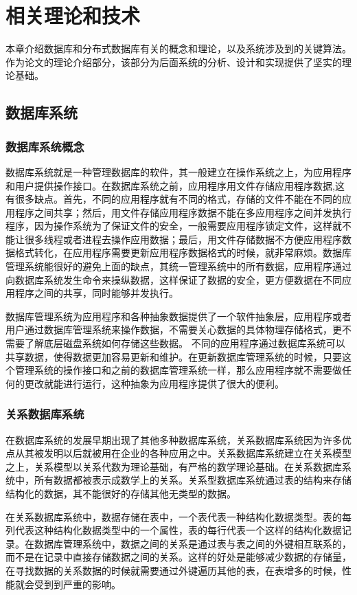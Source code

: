 
\chapter{相关理论和技术}
本章介绍数据库和分布式数据库有关的概念和理论，以及系统涉及到的关键算法。作为论文的理论介绍部分，该部分为后面系统的分析、设计和实现提供了坚实的理论基础。
\section{数据库系统}
\subsection{数据库系统概念}
数据库系统就是一种管理数据库的软件，其一般建立在操作系统之上，为应用程序和用户提供操作接口。在数据库系统之前，应用程序用文件存储应用程序数据,这有很多缺点。首先，不同的应用程序就有不同的格式，存储的文件不能在不同的应用程序之间共享；然后，用文件存储应用程序数据不能在多应用程序之间并发执行程序，因为操作系统为了保证文件的安全，一般需要应用程序锁定文件，这样就不能让很多线程或者进程去操作应用数据；最后，用文件存储数据不方便应用程序数据格式转化，在应用程序需要更新应用程序数据格式的时候，就非常麻烦。数据库管理系统能很好的避免上面的缺点，其统一管理系统中的所有数据，应用程序通过向数据库系统发生命令来操纵数据，这样保证了数据的安全，更方便数据在不同应用程序之间的共享，同时能够并发执行。

数据库管理系统为应用程序和各种抽象数据提供了一个软件抽象层，应用程序或者用户通过数据库管理系统来操作数据，不需要关心数据的具体物理存储格式，更不需要了解底层磁盘系统如何存储这些数据。
不同的应用程序通过数据库系统可以共享数据，使得数据更加容易更新和维护。在更新数据库管理系统的时候，只要这个管理系统的操作接口和之前的数据库管理系统一样，那么应用程序就不需要做任何的更改就能进行运行，这种抽象为应用程序提供了很大的便利。
\subsection{关系数据库系统}
在数据库系统的发展早期出现了其他多种数据库系统，关系数据库系统因为许多优点从其被发明以后就被用在企业的各种应用之中。关系数据库系统建立在关系模型之上，关系模型以关系代数为理论基础，有严格的数学理论基础。在关系数据库系统中，所有数据都被表示成数学上的关系。关系型数据库系统通过表的结构来存储结构化的数据，其不能很好的存储其他无类型的数据。

在关系数据库系统中，数据存储在表中，一个表代表一种结构化数据类型。表的每列代表这种结构化数据类型中的一个属性，表的每行代表一个这样的结构化数据记录。在数据库管理系统中，数据之间的关系是通过表与表之间的外键相互联系的，而不是在记录中直接存储数据之间的关系。这样的好处是能够减少数据的存储量，在寻找数据的关系数据的时候就需要通过外键遍历其他的表，在表增多的时候，性能就会受到到严重的影响。

